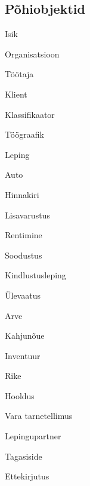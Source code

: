 \subsection{Põhiobjektid}
\begin{myitemize}
	\item Isik
	\item Organisatsioon
	\item Töötaja
	\item Klient
	\item Klassifikaator
	\item Töögraafik
	\item Leping
	\item Auto
	\item Hinnakiri
	\item Lisavarustus
	\item Rentimine
	\item Soodustus
	\item Kindlustusleping
	\item Ülevaatus
	\item Arve
	\item Kahjunõue
	\item Inventuur
	\item Rike
	\item Hooldus
	\item Vara tarnetellimus
	\item Lepingupartner
	\item Tagasiside
	\item Ettekirjutus
\end{myitemize}

